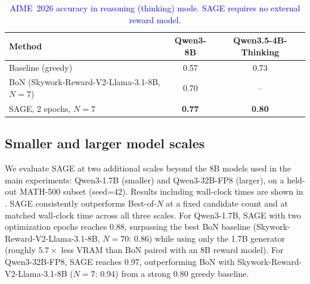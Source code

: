 \documentclass{article}
\theoremstyle{plain}
\theoremstyle{definition}
\theoremstyle{remark}
\newcommand{\method}{SAGE} %
\begin{document}
\begin{table}[h]
\caption{\textcolor{blue}{AIME~2026 accuracy in reasoning (thinking) mode. \method{} requires no external reward model.}}
\label{tab:aime2026}
\vskip 0.1in
\centering
\begin{small}
\begin{sc}
\begin{tabular}{lcc}
\toprule
Method & Qwen3-8B & Qwen3.5-4B-Thinking \\
\midrule
Baseline (greedy) & 0.57 & 0.73 \\
BoN (Skywork-Reward-V2-Llama-3.1-8B, $N=7$) & 0.70 & -- \\
\method{}, 2 epochs, $N=7$ & \textbf{0.77} & \textbf{0.80} \\
\bottomrule
\end{tabular}
\end{sc}
\end{small}
\vskip -0.1in
\end{table}

\subsection{Smaller and larger model scales}

We evaluate \method{} at two additional scales beyond the 8B models used in the main experiments: Qwen3-1.7B (smaller) and Qwen3-32B-FP8 (larger), on a held-out MATH-500 subset (seed=42). Results including wall-clock times are shown in . \method{} consistently outperforms Best-of-\(N\) at a fixed candidate count and at matched wall-clock time across all three scales. For Qwen3-1.7B, \method{} with two optimization epochs reaches 0.88, surpassing the best BoN baseline (Skywork-Reward-V2-Llama-3.1-8B, $N=70$: 0.86) while using only the 1.7B generator (roughly $5.7\times$ less VRAM than BoN paired with an 8B reward model). For Qwen3-32B-FP8, \method{} reaches 0.97, outperforming BoN with Skywork-Reward-V2-Llama-3.1-8B ($N=7$: 0.94) from a strong 0.80 greedy baseline.
\end{document}
